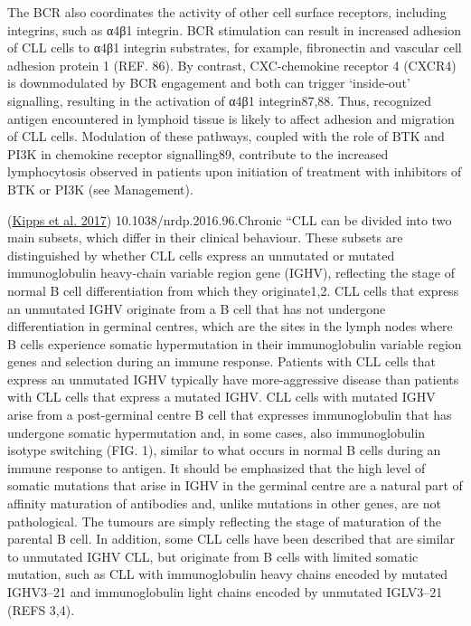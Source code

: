 \documentclass[11pt, a4paper, twosided]{book}
\begin{document}
The BCR also coordinates the activity of other cell surface receptors, including integrins, such as α4β1 integrin. BCR stimulation can result in increased adhesion of CLL cells to α4β1 integrin substrates, for example, fibronectin and vascular cell adhesion protein 1 (REF. 86). By contrast, CXC-chemokine receptor 4 (CXCR4) is downmodulated by BCR engagement and both can trigger `inside-out' signalling, resulting in the activation of α4β1 integrin87,88. Thus, recognized antigen encountered in lymphoid tissue is likely to affect adhesion and migration of CLL cells. Modulation of these pathways, coupled with the role of BTK and PI3K in chemokine receptor signalling89, contribute to the increased lymphocytosis observed in patients upon initiation of treatment with inhibitors of BTK or PI3K (see Management).

(\protect\hyperlink{ref-Kipps2017}{Kipps et al. 2017}) 10.1038/nrdp.2016.96.Chronic
``CLL can be divided into two main subsets, which differ in their clinical behaviour. These subsets are distinguished by whether CLL cells express an unmutated or mutated immunoglobulin heavy-chain variable region gene (IGHV), reflecting the stage of normal B cell differentiation from which they originate1,2. CLL cells that express an unmutated IGHV originate from a B cell that has not undergone differentiation in germinal centres, which are the sites in the lymph nodes where B cells experience somatic hypermutation in their immunoglobulin variable region genes and selection during an immune response. Patients with CLL cells that express an unmutated IGHV typically have more-aggressive disease than patients with CLL cells that express a mutated IGHV. CLL cells with mutated IGHV arise from a post-germinal centre B cell that expresses immunoglobulin that has undergone somatic hypermutation and, in some cases, also immunoglobulin isotype switching (FIG. 1), similar to what occurs in normal B cells during an immune response to antigen. It should be emphasized that the high level of somatic mutations that arise in IGHV in the germinal centre are a natural part of affinity maturation of antibodies and, unlike mutations in other genes, are not pathological. The tumours are simply reflecting the stage of maturation of the parental B cell. In addition, some CLL cells have been described that are similar to unmutated IGHV CLL, but originate from B cells with limited somatic mutation, such as CLL with immunoglobulin heavy chains encoded by mutated IGHV3--21 and immunoglobulin light chains encoded by unmutated IGLV3--21 (REFS 3,4).
\end{document}
